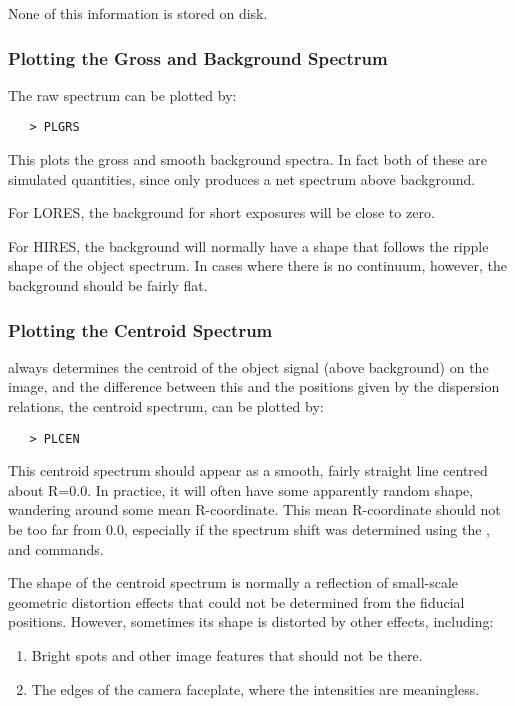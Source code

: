 None of this information is stored on disk.

\subsubsection{Plotting the Gross and Background Spectrum}

The raw spectrum can be plotted by:

\begin{verbatim}
   > PLGRS
\end{verbatim}

This plots the gross and smooth background spectra.  In fact both of these
are simulated quantities, since 
 only produces a net spectrum above
background.

For LORES, the background for short exposures will be close to zero.

For HIRES, the background will normally have a shape that follows the ripple
shape of the object spectrum.  In cases where there is no continuum, however,
the background should be fairly flat.

\subsubsection{Plotting the Centroid Spectrum}

 always determines the centroid of the object signal (above
background) on the image, and the difference between this and the
positions given by the dispersion relations, the centroid spectrum, can be
plotted by:

\begin{verbatim}
   > PLCEN
\end{verbatim}

This centroid spectrum should appear as a smooth, fairly straight line centred
about R=0.0\@.  In practice, it will often have some apparently random shape,
wandering around some mean R-coordinate.  This mean R-coordinate should
not be too far from 0.0, especially if the spectrum shift was determined
using the , 
 and  commands.

The shape of the centroid spectrum is normally a reflection of small-scale
geometric distortion effects that could not be determined from the fiducial
positions.  However, sometimes its shape is distorted by other effects,
including:

\begin{enumerate}

\item Bright spots and other image features that should not be there.

\item The edges of the camera faceplate, where the intensities are
      meaningless.

\end{enumerate}

